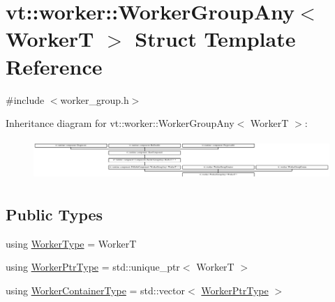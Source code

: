 \hypertarget{structvt_1_1worker_1_1_worker_group_any}{}\section{vt\+:\+:worker\+:\+:Worker\+Group\+Any$<$ WorkerT $>$ Struct Template Reference}
\label{structvt_1_1worker_1_1_worker_group_any}


{\ttfamily \#include $<$worker\+\_\+group.\+h$>$}

Inheritance diagram for vt\+:\+:worker\+:\+:Worker\+Group\+Any$<$ WorkerT $>$\+:\begin{figure}[H]
\begin{center}
\leavevmode
\includegraphics[height=1.545254cm]{structvt_1_1worker_1_1_worker_group_any}
\end{center}
\end{figure}
\subsection*{Public Types}
\begin{DoxyCompactItemize}
\item 
using \hyperlink{structvt_1_1worker_1_1_worker_group_any_af82b0c60f233e4ec668532ae46cda2e6}{Worker\+Type} = WorkerT
\item 
using \hyperlink{structvt_1_1worker_1_1_worker_group_any_a1c5f50479aa26bcea9491f5ca41138d7}{Worker\+Ptr\+Type} = std\+::unique\+\_\+ptr$<$ WorkerT $>$
\item 
using \hyperlink{structvt_1_1worker_1_1_worker_group_any_ad7e74c099f11c75bc35c838baedaa2cd}{Worker\+Container\+Type} = std\+::vector$<$ \hyperlink{structvt_1_1worker_1_1_worker_group_any_a1c5f50479aa26bcea9491f5ca41138d7}{Worker\+Ptr\+Type} $>$
\end{DoxyCompactItemize}
